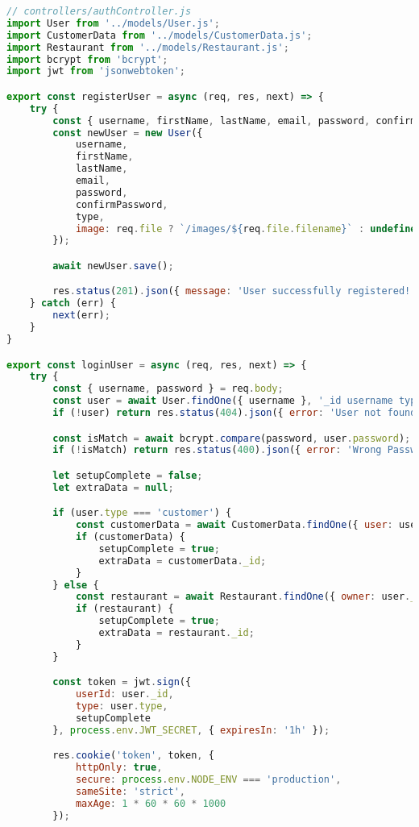 \documentclass[12pt,a4paper]{article}
\begin{document}
\begin{lstlisting}[language=JavaScript, caption=Controller di autenticazione]
// controllers/authController.js
import User from '../models/User.js';
import CustomerData from '../models/CustomerData.js';
import Restaurant from '../models/Restaurant.js';
import bcrypt from 'bcrypt';
import jwt from 'jsonwebtoken';

export const registerUser = async (req, res, next) => {
    try {
        const { username, firstName, lastName, email, password, confirmPassword, type } = req.body;
        const newUser = new User({
            username,
            firstName,
            lastName,
            email,
            password,
            confirmPassword,
            type,
            image: req.file ? `/images/${req.file.filename}` : undefined
        });

        await newUser.save();

        res.status(201).json({ message: 'User successfully registered!' });
    } catch (err) {
        next(err);
    }
}

export const loginUser = async (req, res, next) => {
    try {
        const { username, password } = req.body;
        const user = await User.findOne({ username }, '_id username type password');
        if (!user) return res.status(404).json({ error: 'User not found.' });

        const isMatch = await bcrypt.compare(password, user.password);
        if (!isMatch) return res.status(400).json({ error: 'Wrong Password.' });

        let setupComplete = false;
        let extraData = null;

        if (user.type === 'customer') {
            const customerData = await CustomerData.findOne({ user: user._id });
            if (customerData) {
                setupComplete = true;
                extraData = customerData._id;
            }
        } else { 
            const restaurant = await Restaurant.findOne({ owner: user._id });
            if (restaurant) {
                setupComplete = true;
                extraData = restaurant._id;
            }
        }

        const token = jwt.sign({
            userId: user._id,
            type: user.type,
            setupComplete
        }, process.env.JWT_SECRET, { expiresIn: '1h' });

        res.cookie('token', token, {
            httpOnly: true,
            secure: process.env.NODE_ENV === 'production',
            sameSite: 'strict',
            maxAge: 1 * 60 * 60 * 1000
        });


\end{lstlisting}
\end{document}
